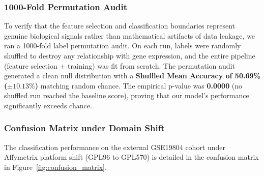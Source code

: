 \documentclass[journal,10pt]{IEEEtran}
\begin{document}
\subsubsection{1000-Fold Permutation Audit}
To verify that the feature selection and classification boundaries represent genuine biological signals rather than mathematical artifacts of data leakage, we ran a 1000-fold label permutation audit. On each run, labels were randomly shuffled to destroy any relationship with gene expression, and the entire pipeline (feature selection + training) was fit from scratch. The permutation audit generated a clean null distribution with a \textbf{Shuffled Mean Accuracy of 50.69\% ($\pm 10.13\%$)} matching random chance. The empirical p-value was \textbf{0.0000} (no shuffled run reached the baseline score), proving that our model's performance significantly exceeds chance.

\subsubsection{Confusion Matrix under Domain Shift}
The classification performance on the external GSE19804 cohort under Affymetrix platform shift (GPL96 to GPL570) is detailed in the confusion matrix in Figure~\ref{fig:confusion_matrix}.
\end{document}
